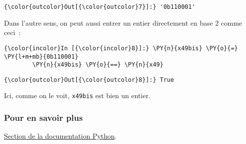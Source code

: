 \begin{Verbatim}[commandchars=\\\{\}]
{\color{outcolor}Out[{\color{outcolor}7}]:} '0b110001'
\end{Verbatim}
            
    Dans l'autre sens, on peut aussi entrer un entier directement en base 2
comme ceci~:

    \begin{Verbatim}[commandchars=\\\{\}]
{\color{incolor}In [{\color{incolor}8}]:} \PY{n}{x49bis} \PY{o}{=} \PY{l+m+mb}{0b110001}
        \PY{n}{x49bis} \PY{o}{==} \PY{n}{x49}
\end{Verbatim}


\begin{Verbatim}[commandchars=\\\{\}]
{\color{outcolor}Out[{\color{outcolor}8}]:} True
\end{Verbatim}
            
    Ici, comme on le voit, \texttt{x49bis} est bien un entier.

    \hypertarget{pour-en-savoir-plus}{%
\subsubsection{Pour en savoir plus}\label{pour-en-savoir-plus}}

    \href{https://docs.python.org/3/library/stdtypes.html\#bitwise-operations-on-integer-types}{Section
de la documentation Python}.


    
    
    
